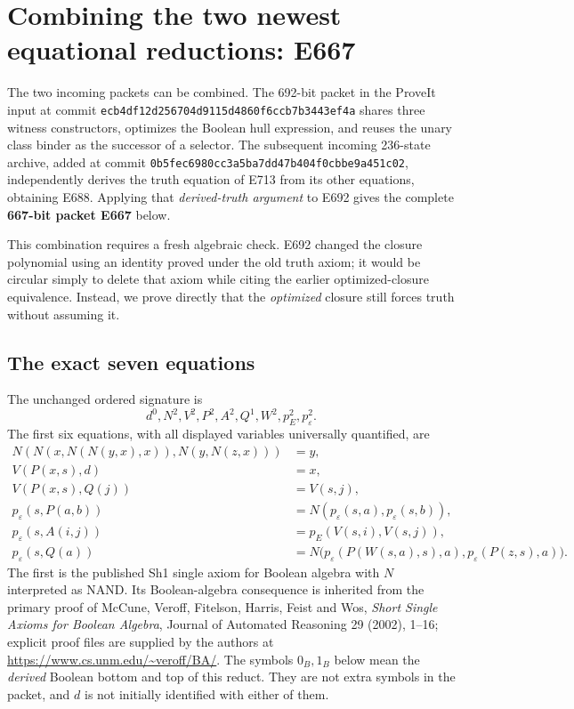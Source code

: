 \section{Combining the two newest equational reductions: E667}
\label{sec:e667-combination}

The two incoming packets can be combined. The 692-bit packet in the
ProveIt input at commit
\texttt{ecb4df12d256704d9115d4860f6ccb7b3443ef4a}
shares three witness constructors, optimizes the Boolean hull expression,
and reuses the unary class binder as the successor of a selector.
The subsequent incoming 236-state archive, added at commit
\texttt{0b5fec6980cc3a5ba7dd47b404f0cbbe9a451c02}, independently derives
the truth equation of E713 from its other equations, obtaining E688.
Applying that \emph{derived-truth argument} to E692 gives the complete
\textbf{667-bit packet E667} below.

This combination requires a fresh algebraic check. E692 changed the
closure polynomial using an identity proved under the old truth axiom;
it would be circular simply to delete that axiom while citing the
earlier optimized-closure equivalence. Instead, we prove directly that
the \emph{optimized} closure still forces truth without assuming it.

\subsection{The exact seven equations}

The unchanged ordered signature is
\[
 d^0,N^2,V^2,P^2,A^2,Q^1,W^2,p_E^2,p_\varepsilon^2.
\]
The first six equations, with all displayed variables universally
quantified, are
\begin{align}
 N(N(x,N(N(y,x),x)),N(y,N(z,x)))&=y,
     \label{eq:e667-sh1}\\
 V(P(x,s),d)&=x,\label{eq:e667-head}\\
 V(P(x,s),Q(j))&=V(s,j),\label{eq:e667-tail}\\
 p_\varepsilon(s,P(a,b))
   &=N(p_\varepsilon(s,a),p_\varepsilon(s,b)),
       \label{eq:e667-nand}\\
 p_\varepsilon(s,A(i,j))&=p_E(V(s,i),V(s,j)),
       \label{eq:e667-atom}\\
 p_\varepsilon(s,Q(a))
   &=N\bigl(p_\varepsilon(P(W(s,a),s),a),
            p_\varepsilon(P(z,s),a)\bigr).
       \label{eq:e667-binder}
\end{align}
The first is the published Sh1 single axiom for Boolean algebra with
$N$ interpreted as NAND. Its Boolean-algebra consequence is inherited
from the primary proof of McCune, Veroff, Fitelson, Harris, Feist and Wos,
\emph{Short Single Axioms for Boolean Algebra}, Journal of Automated
Reasoning 29 (2002), 1--16; explicit proof files are supplied by the
authors at \url{https://www.cs.unm.edu/~veroff/BA/}.
The symbols $0_B,1_B$ below mean the \emph{derived} Boolean bottom and
top of this reduct. They are not extra symbols in the packet, and $d$
is not initially identified with either of them.

